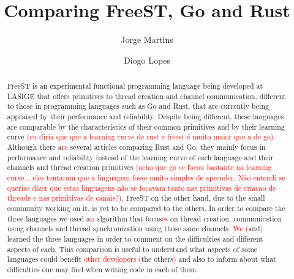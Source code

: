\documentclass[runningheads]{llncs}
\begin{document}
\title{Comparing FreeST, Go and Rust}
\author{Jorge Martins \and
Diogo Lopes
}
\nocite{*}
\maketitle
\thispagestyle{empty}
\begin{abstract}
FreeST is an experimental functional programming language being developed at LASIGE that offers primitives to thread creation and channel communication, different to those in programming languages such as Go and Rust, that are currently being appraised by their performance and reliability. Despite being different, these languages are comparable by the characteristics of their common primitives and by their learning curve \textcolor{red}{(eu diria que que a learning curve de rust e freest é muito maior que a de go)}. Although there a\textcolor{red}{re} several articles comparing Rust and Go, they mainly focus in performance and reliability instead of the learning curve of each language and their channels and thread creation primitives \textcolor{red}{(acho que go se focou bastante na learning curve... eles tentaram que a linguagem fosse muito simples de aprender. Não entendi se querias dizer que estas linguagens não se focavam tanto  nas primitivas de criacao de threads e nas primitivas de canais?)}. FreeST on the other hand, due to the small community working on it, is yet to be compared to the others.
In order to compare the three languages we used a\textcolor{red}{n} algorithm that focus\textcolor{red}{es} on thread creation, communication using channels and thread synchronization using those same channels\textcolor{red}{. We } \textcolor{red}{(}and\textcolor{red}{)} learned the three languages in order to comment on the difficulties and different aspects of each.
This comparison is useful to understand what aspects of some languages could benefit \textcolor{red}{other developers (}the others\textcolor{red}{)} and also to inform about what difficulties one may find when writing code in each of them.
\end{abstract}
\end{document}
